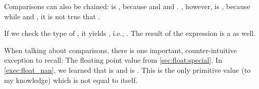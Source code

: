 Comparisons can also be chained:
 is , because  and  and .
, however, is , because while  and , it is not true that .

If we check the type of , it yields , i.e., .
The result of the expression  is a  as well.

When talking about comparisons, there is one important, counter-intuitive exception to recall:
The  floating point value from \cref{sec:float:special}.
In \cref{exec:float_nan}, we learned that \pythonIdx{==} is  and  is .
This is the only primitive value (to my knowledge) which is not equal to itself.%
\endhsection%
%
%
%
%

